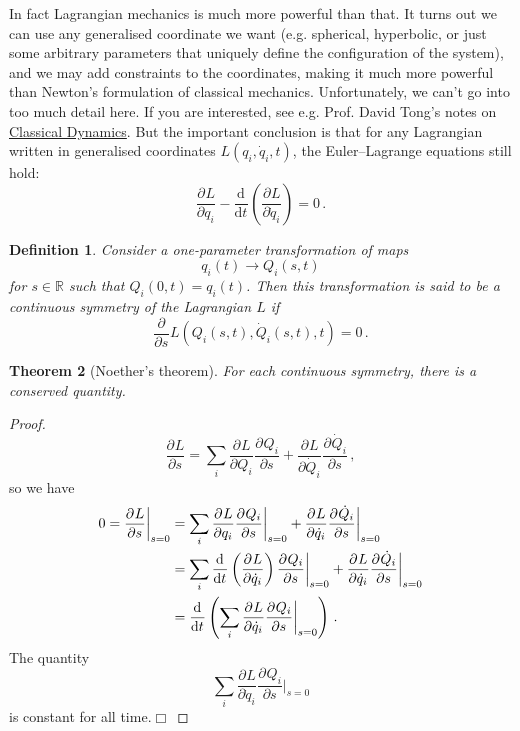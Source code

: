 \documentclass{article}
\theoremstyle{plain}\theoremheaderfont{\normalfont\itshape}\theorembodyfont{\rmfamily}\theoremseparator{.}\newtheorem*{rem}{Remark}\newtheorem*{ex}{Example}\newtheorem*{proof}{Proof}\newtheorem*{altp}{Alternative proof}
\theoremstyle{plain}\theoremheaderfont{\normalfont\bfseries}\theorembodyfont{\rmfamily}\theoremseparator{.}\newtheorem{thm}{Theorem}[section]\newtheorem{lem}[thm]{Lemma}\newtheorem{prop}[thm]{Proposition}\newtheorem*{cor}{Corollary}\newtheorem{defn}[thm]{Definition}\newtheorem{clm}[thm]{Claim}\newtheorem{clminproof}{Claim}\newtheorem{alg}[thm]{Algorithm}\newtheorem{hyp}[thm]{Hypothesis}\newtheorem{law}[thm]{Law}
\theoremstyle{break}\theoremheaderfont{\normalfont\itshape}\theorembodyfont{\rmfamily}\theoremseparator{.\medskip}\newtheorem*{proofskip}{Proof}\newtheorem*{exs}{Examples}\newtheorem*{rems}{Remarks}
\theoremstyle{break}\theoremheaderfont{\normalfont\bfseries}\theorembodyfont{\rmfamily}\theoremseparator{.\medskip}\newtheorem{lemskip}[thm]{Lemma}\newtheorem{defnskip}[thm]{Definition}\newtheorem{propskip}[thm]{Proposition}\newtheorem{thmskip}[thm]{Theorem}
\numberwithin{equation}{section}
\newcommand{\qed}{\hfill\ensuremath{\Box}}
\newcommand{\dv}[3][]{\frac{\mathrm{d}^{#1} #2}{{\mathrm{d} #3}^{#1}}}
\newcommand{\pdv}[3][]{\frac{\partial^{#1} #2}{{\partial #3}^{#1}}}
\newcommand{\RR}{\mathbb{R}}
\begin{document}
    In fact Lagrangian mechanics is much more powerful than that. It turns out we can use any generalised coordinate we want (e.g. spherical, hyperbolic, or just some arbitrary parameters that uniquely define the configuration of the system), and we may add constraints to the coordinates, making it much more powerful than Newton's formulation of classical mechanics. Unfortunately, we can't go into too much detail here. If you are interested, see e.g. Prof. David Tong's notes on \href{https://www.damtp.cam.ac.uk/user/tong/dynamics.html}{Classical Dynamics}. But the important conclusion is that for any Lagrangian written in generalised coordinates \(L(q_i,\dot{q}_i,t)\), the Euler--Lagrange equations still hold:
    \begin{equation}
        \pdv{L}{q_i}-\dv{}{t}\left(\pdv{L}{\dot{q}_i}\right)=0\,.
    \end{equation}

    \begin{defn}
        Consider a one-parameter transformation of maps
        \begin{equation}
            q_i(t)\longrightarrow Q_i(s,t)
        \end{equation}
        for \(s\in\RR\) such that \(Q_i(0,t)=q_i(t)\). Then this transformation is said to be a \textit{continuous symmetry} of the Lagrangian \(L\) if
        \begin{equation}
            \pdv{}{s}L(Q_i(s,t),\dot{Q}_i(s,t),t)=0\,.
        \end{equation}
    \end{defn}
    \begin{thm}[Noether's theorem]
        For each continuous symmetry, there is a conserved quantity.
    \end{thm}
    \begin{proof}
        \begin{equation}
            \pdv{L}{s}=\sum_i \pdv{L}{Q_i}\pdv{Q_i}{s}+\pdv{L}{\dot{Q}_i}\pdv{\dot{Q}_i}{s}\,,
        \end{equation}
        so we have
        \begin{align}
            0=\pdv{L}{s}\bigg|_{s=0}&=\sum_i\pdv{L}{q_i}\pdv{Q_i}{s}\bigg|_{s=0}+\pdv{L}{\dot{q}_i}\pdv{\dot{Q}_i}{s}\bigg|_{s=0}\notag\\
            &=\sum_i\dv{}{t}\left(\pdv{L}{\dot{q}_i}\right)\pdv{Q_i}{s}\bigg|_{s=0}+\pdv{L}{\dot{q}_i}\pdv{\dot{Q}_i}{s}\bigg|_{s=0}\notag \\
            &=\dv{}{t}\left(\sum_i\pdv{L}{\dot{q}_i}\pdv{Q_i}{s}\bigg|_{s=0}\right)\,.
        \end{align}
        The quantity
        \begin{equation}
            \sum_i\pdv{L}{\dot{q}_i}\pdv{Q_i}{s}\bigg|_{s=0}
        \end{equation}
        is constant for all time.\qed
    \end{proof}
\end{document}
